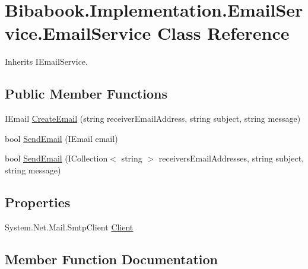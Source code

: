 \hypertarget{class_bibabook_1_1_implementation_1_1_email_service_1_1_email_service}{}\section{Bibabook.\+Implementation.\+Email\+Service.\+Email\+Service Class Reference}
\label{class_bibabook_1_1_implementation_1_1_email_service_1_1_email_service}


Inherits I\+Email\+Service.

\subsection*{Public Member Functions}
\begin{DoxyCompactItemize}
\item 
I\+Email \hyperlink{class_bibabook_1_1_implementation_1_1_email_service_1_1_email_service_a11c5b062ce9466198e8e1867d98132f2}{Create\+Email} (string receiver\+Email\+Address, string subject, string message)
\item 
bool \hyperlink{class_bibabook_1_1_implementation_1_1_email_service_1_1_email_service_a50ff5fcda3821c245f32052c2793f713}{Send\+Email} (I\+Email email)
\item 
bool \hyperlink{class_bibabook_1_1_implementation_1_1_email_service_1_1_email_service_aa00b042fe958ce792c99c3c5101b24a3}{Send\+Email} (I\+Collection$<$ string $>$ receivers\+Email\+Addresses, string subject, string message)
\end{DoxyCompactItemize}
\subsection*{Properties}
\begin{DoxyCompactItemize}
\item 
System.\+Net.\+Mail.\+Smtp\+Client \hyperlink{class_bibabook_1_1_implementation_1_1_email_service_1_1_email_service_a8bcc8888961a94b44a79bedaa82fbe63}{Client}
\end{DoxyCompactItemize}


\subsection{Member Function Documentation}
\hypertarget{class_bibabook_1_1_implementation_1_1_email_service_1_1_email_service_a11c5b062ce9466198e8e1867d98132f2}{}
